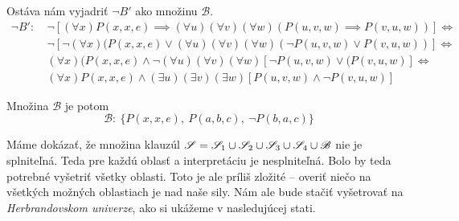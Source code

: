 \begin{priklad}
    Ostáva nám vyjadriť $\neg B'$ ako množinu $\mathscr{B}$.
    \begin{align*}
        \neg B':\ &
            \neg [(\forall x) P(x,x,e) \implies
                    (\forall u) (\forall v)(\forall w)(P(u,v,w) \implies
                    P(v,u,w))] \iff \\
        & \neg [ \neg (\forall x) (P(x,x,e)
                \lor (\forall u) (\forall v) (\forall w)
                    (\neg P(u,v,w) \lor P(v,u,w))] \iff \\
        &(\forall x) (P(x,x,e) \land \neg (\forall u)(\forall v) (\forall w) 
          [\neg P(u,v,w) \lor (P(v,u,w)] \iff \\
        & (\forall x) P(x,x,e)
            \land (\exists u) (\exists v) (\exists w)
                    [P(u,v,w)\land \neg P(v,u,w)]
    \end{align*}

    Množina $\mathscr{B}$ je potom
    \begin{equation*}
        \mathscr{B}:\  \Big\{P(x,x,e),\ P(a,b,c),\ \neg P(b,a,c) \Big\}
    \end{equation*}

    Máme dokázať, že množina klauzúl 
    $\mathscr{S} = \mathscr{S}_1 \cup \mathscr{S}_2 \cup
        \mathscr{S}_3 \cup \mathscr{S}_4 \cup \mathscr{B}$
    nie je splniteľná. Teda pre každú oblasť a interpretáciu je
    nesplniteľná.
    Bolo by teda potrebné vyšetriť všetky oblasti.
    Toto je ale príliš zložité -- overiť niečo na všetkých možných
    oblastiach je nad naše sily.
    Nám ale bude stačiť vyšetrovať na {\it Herbrandovskom univerze},
    ako si ukážeme v nasledujúcej stati.
\end{priklad}
